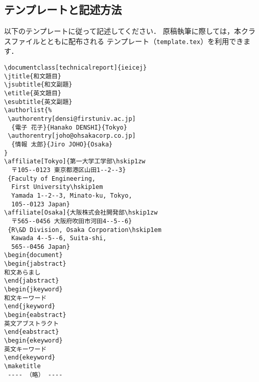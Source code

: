\documentclass[technicalreport]{ieicej}
\begin{document}
\subsection{テンプレートと記述方法}
\label{sec:technicalreport}

以下のテンプレートに従って記述してください．
原稿執筆に際しては，本クラスファイルとともに配布される
テンプレート（\texttt{template.tex}）を利用できます．

\begin{verbatim}
\documentclass[technicalreport]{ieicej}
\jtitle{和文題目}
\jsubtitle{和文副題}
\etitle{英文題目}
\esubtitle{英文副題}
\authorlist{%
 \authorentry[densi@firstuniv.ac.jp]
  {電子 花子}{Hanako DENSHI}{Tokyo}
 \authorentry[joho@ohsakacorp.co.jp]
  {情報 太郎}{Jiro JOHO}{Osaka}
}
\affiliate[Tokyo]{第一大学工学部\hskip1zw
  〒105--0123 東京都港区山田1--2--3}
 {Faculty of Engineering, 
  First University\hskip1em
  Yamada 1--2--3, Minato-ku, Tokyo,
  105--0123 Japan}
\affiliate[Osaka]{大阪株式会社開発部\hskip1zw
  〒565--0456 大阪府吹田市河田4--5--6}
 {R\&D Division, Osaka Corporation\hskip1em
  Kawada 4--5--6, Suita-shi,
  565--0456 Japan}
\begin{document}
\begin{jabstract}
和文あらまし
\end{jabstract}
\begin{jkeyword}
和文キーワード
\end{jkeyword}
\begin{eabstract}
英文アブストラクト
\end{eabstract}
\begin{ekeyword}
英文キーワード
\end{ekeyword}
\maketitle
 ---- （略） ----
\end{verbatim}
\end{document}

